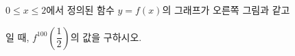\hspace*{2mm}\begin{minipage}[t]{\dimexpr\linewidth-2mm\relax}\vspace{0pt}
\noindent\begin{minipage}[t]{0.58\linewidth}\vspace{0pt}\raggedright $0\le x\le 2$에서 정의된 함수 $y=f(x)$의 그래프가 오른쪽 그림과 같고\par\smallskip\end{minipage}\hfill\begin{minipage}[t]{0.4\linewidth}\vspace{0pt}\centering \resizebox{\ifdim\width>\linewidth\linewidth\else\width\fi}{!}{}\end{minipage}\par
\noindent {}\par\smallskip\noindent 일 때, $f^{100}\!\left(\dfrac{1}{2}\right)$의 값을 구하시오.\end{minipage}
